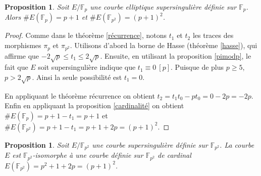 \documentclass{article}
\theoremstyle{plain}%
\newtheorem{prop}[thm]{Proposition}
\theoremstyle{definition}%
\newcommand{\F}{\mathbb{F}}
\begin{document}
\begin{prop}
  Soit $E/\F_p$ une courbe elliptique supersingulière définie sur $\F_p$. Alors $\# E(\F_p) = p+ 1$ et $\# E (\F_{p^2}) = (p + 1)^2$.
\end{prop}

\begin{proof}
  Comme dans le théorème \ref{récurrence}, notons $t_1$ et $t_2$ les traces des morphismes $\pi_p$ et $\pi_{p^2}$. Utilisons d'abord la borne de Hasse (théorème \ref{hasse}), qui affirme que $-2\sqrt{p} \le t_1\le 2\sqrt{p}$. Ensuite, en utilisant la proposition \ref{pimodp}, le fait que $E$ soit supersingulière indique que $t_1\equiv 0\ [p]$. Puisque de plus $p\ge 5$, $p> 2\sqrt{p}$. Ainsi la seule possibilité est $t_1 = 0$.

  En appliquant le théorème récurrence on obtient $t_2 = t_1t_0-pt_0 = 0-2p = -2p$. Enfin en appliquant la proposition \ref{cardinalité} on obtient $\# E(\F_p) = p + 1 - t_1 = p+1$ et $\# E (\F_{p^2}) = p +1 -t_1 = p + 1 + 2p = (p + 1)^2$.
\end{proof}

\begin{prop}
\label{cardsuper} 
Soit $E/\F_{p^2}$ une courbe supersingulière définie sur $\F_{p^2}$. La courbe $E$ est $\F_{p^2}$-isomorphe à une courbe définie sur $\F_{p^2}$ de cardinal $E(\F_{p^2}) = p^2 + 1 + 2p = (p+1)^2$.
\end{prop}
\end{document}
